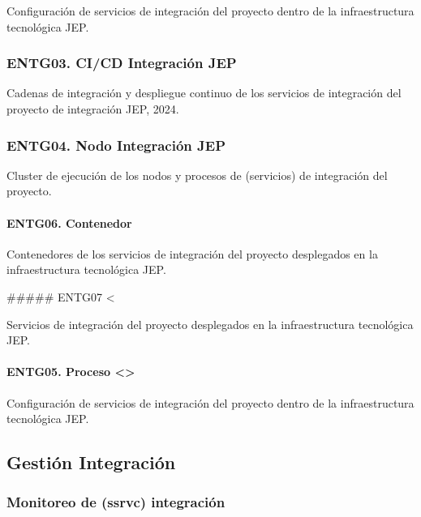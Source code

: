 \documentclass[
  paper=a4,
  ,captions=tableheading
]{scrartcl}
\renewenvironment{quote}{\begin{customblockquote}\list{}{\rightmargin=0em\leftmargin=0em}%
\item\relax\color{blockquote-text}\ignorespaces}{\unskip\unskip\endlist\end{customblockquote}}
\begin{document}
Configuración de servicios de integración del proyecto dentro de la
infraestructura tecnológica JEP.

\subsubsection{ENTG03. CI/CD Integración
JEP}\label{sec:entg03.-cicd-integraciuxf3n-jep}

Cadenas de integración y despliegue continuo de los servicios de
integración del proyecto de integración JEP, 2024.

\subsubsection{ENTG04. Nodo Integración
JEP}\label{sec:entg04.-nodo-integraciuxf3n-jep-1}

Cluster de ejecución de los nodos y procesos de (servicios) de
integración del proyecto.

\paragraph{ENTG06. Contenedor}\label{sec:entg06.-contenedor-1}

Contenedores de los servicios de integración del proyecto desplegados en
la infraestructura tecnológica JEP.

\#\#\#\#\# ENTG07 \textless{}

\begin{quote}
\end{quote}

Servicios de integración del proyecto desplegados en la infraestructura
tecnológica JEP.

\paragraph{\texorpdfstring{ENTG05. Proceso
\textless{}\textgreater{}}{ENTG05. Proceso \textless\textgreater{}}}\label{sec:entg05.-proceso-1}

Configuración de servicios de integración del proyecto dentro de la
infraestructura tecnológica JEP.

\subsection{Gestión Integración}\label{sec:gestiuxf3n-integraciuxf3n}

\subsubsection{Monitoreo de (ssrvc)
integración}\label{sec:monitoreo-de-ssrvc-integraciuxf3n}
\end{document}
